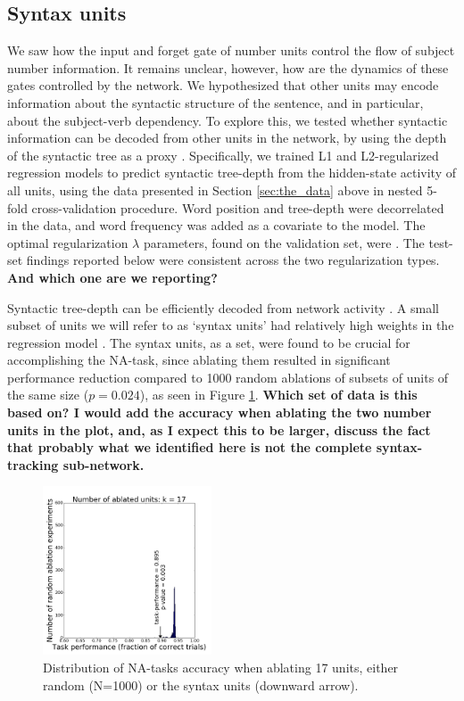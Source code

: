 \subsection{Syntax units}
\label{sec:syntax-units}
We saw how the input and forget gate of number units control the flow
of subject number information. It remains unclear, however, how are
the dynamics of these gates controlled by the network. We hypothesized
that other units may encode information about the syntactic structure
of the sentence, and in particular, about the subject-verb
dependency. To explore this, we tested whether syntactic information
can be decoded from other units in the network, by using the depth of
the syntactic tree as a proxy \cite{Nelson:etal:2017}. Specifically,
we trained L1 and L2-regularized regression models to predict
syntactic tree-depth from the hidden-state activity of all units,
using the data presented in Section \ref{sec:the_data} above in nested
5-fold cross-validation procedure.  Word position and tree-depth were
decorrelated in the data, and word frequency was added as a covariate
to the model. The optimal regularization $\lambda$ parameters, found
on the validation set, were . The test-set
findings reported below were consistent across the two regularization
types. \textbf{And which one are we reporting?}

Syntactic tree-depth can be efficiently decoded from network activity
. A small subset of units we will refer to
as `syntax units' had relatively high weights in the regression model
. The syntax
units, as a set, were found to be crucial for accomplishing the NA-task, since
ablating them resulted in significant performance reduction compared
to 1000 random ablations of subsets of units of the same size
($p=0.024$), as seen in Figure
\ref{fig:ablation-syntax}. \textbf{Which set of data is this based on?
  I would add the accuracy when ablating the two number units in the
  plot, and, as I expect this to be larger, discuss the fact that
  probably what we identified here is not the complete syntax-tracking
  sub-network.}

\begin{figure}[h]
    \centering
    \includegraphics[height=5cm]{Figures/null_distribution_ablation_experiment_k_17.png}
    \caption{Distribution of NA-tasks accuracy when ablating 17 units,
      either random (N=1000) or the syntax units (downward arrow).}
    \label{fig:ablation-syntax}
\end{figure}

